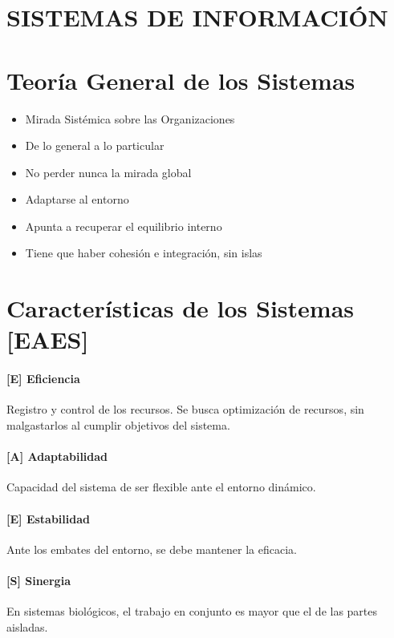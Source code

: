 \twocolumn 

\hypertarget{si}{%
\section{SISTEMAS DE INFORMACIÓN}\label{si}}

\hypertarget{teoruxeda-general-de-los-sistemas}{%
\section{Teoría General de los Sistemas}\label{teoruxeda-general-de-los-sistemas}}

\begin{itemize}
  \setlength\itemsep{-1em}
\item   Mirada Sistémica sobre las Organizaciones
\item   De lo general a lo particular
\item   No perder nunca la mirada global
\item   Adaptarse al entorno
\item   Apunta a recuperar el equilibrio interno
\item   Tiene que haber cohesión e integración, sin islas
\end{itemize}

\hypertarget{caracteruxedsticas-de-los-sistemas-eaes}{%
\section{Características de los Sistemas
{[}EAES{]}}\label{caracteruxedsticas-de-los-sistemas-eaes}}

\hypertarget{eficiencia}{%
\paragraph{{[}E{]} Eficiencia}\label{eficiencia}}
Registro y control de los recursos. Se busca optimización de recursos, sin malgastarlos al cumplir objetivos del sistema.
\hypertarget{adaptabilidad}{%
\paragraph{{[}A{]} Adaptabilidad}\label{adaptabilidad}}
Capacidad del sistema de ser flexible ante el  entorno dinámico.
\hypertarget{estabilidad}{%
\paragraph{{[}E{]} Estabilidad}\label{estabilidad}}
Ante los embates del entorno, se debe mantener la eficacia.
\hypertarget{sinergia}{%
\paragraph{{[}S{]} Sinergia}\label{sinergia}}
En sistemas biológicos, el trabajo en conjunto es mayor que el de las partes aisladas.

